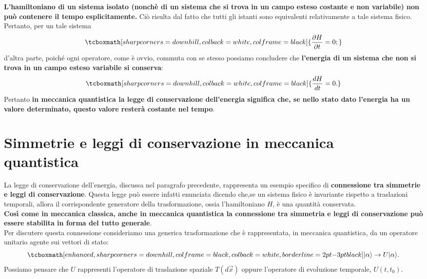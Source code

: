 \documentclass[a4paper,12pt,oneside]{book}
\begin{document}
\textbf{L'hamiltoniano di un sistema isolato (nonchè di un sistema che si trova in un campo esteso costante e non variabile) non può contenere il tempo esplicitamente.} Ciò risulta dal fatto che tutti gli istanti sono equivalenti relativamente a tale sistema fisico. Pertanto, per un tale sistema  
	\begin{equation}
		\tcboxmath[sharp corners=downhill, colback=white, colframe=black]{
			\frac{\partial H}{\partial{t}}=0;
			}
	\end{equation}
d'altra parte, poiché ogni operatore, come è ovvio, commuta con se stesso possiamo concludere che \textbf{l'energia di un sistema che non si trova in un campo esteso variabile si conserva}:
	\begin{equation}
		\tcboxmath[sharp corners=downhill, colback=white, colframe=black]{
			\frac{dH}{dt}=0.
			}
	\end{equation}
Pertanto \textbf{in meccanica quantistica la legge di conservazione dell'energia significa che, se nello stato dato l'energia ha un valore determinato, questo valore resterà costante nel tempo}.

\section[Simmetrie e leggi di conservazione  in meccanica quantistica]{Simmetrie e leggi di conservazione  in meccanica \\quantistica} 

La legge di conservazione dell'energia, discussa nel paragrafo precedente, rappresenta un esempio specifico di \textbf{connessione tra simmetrie e leggi di conservazione}. Questa legge può essere infatti enunciata dicendo che,se un sistema fisico è invariante rispetto a traslazioni temporali, allora il corrispondente generatore della trasformazione, ossia l'hamiltoniano $H$, è una quantità conservata.\\

\textbf{Così come in meccanica classica, anche in meccanica quantistica la connessione tra simmetria e leggi di conservazione può essere stabilita in forma del tutto generale}.\\

Per discutere questa connessione consideriamo una generica trasformazione che è rappresentata, in meccanica quantistica, da un operatore unitario agente sui vettori di stato:
	\begin{equation}
	\label{eq:cap12_3}
		\tcboxmath[enhanced, sharp corners=downhill, colframe=black, colback=white, borderline={2pt}{-3pt}{black}]{
			|\alpha \rangle \rightarrow {U}|\alpha \rangle.
			}
	\end{equation}
Possiamo pensare che ${U}$ rappresenti l'operatore di traslazione spaziale $T(d\vec{x})$ oppure l'operatore di evoluzione temporale, ${U}(t,t_0)$.\\
\end{document}
